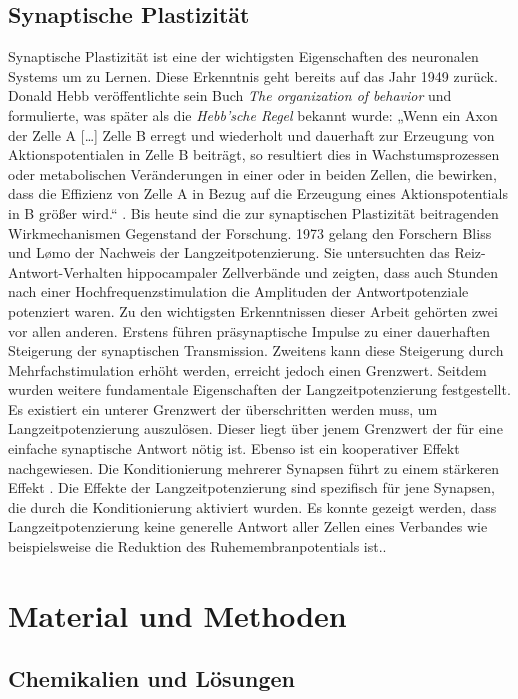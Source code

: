 \documentclass[a4paper,11pt]{report}
\begin{document}
{\section{Synaptische Plastizität}
Synaptische Plastizität ist eine der wichtigsten Eigenschaften des neuronalen Systems um zu Lernen. Diese Erkenntnis geht bereits auf das Jahr 1949 zurück. Donald Hebb veröffentlichte sein Buch \textit{The organization of behavior} und formulierte, was später als die \textit{Hebb'sche Regel} bekannt wurde: „Wenn ein Axon der Zelle A […] Zelle B erregt und wiederholt und dauerhaft zur Erzeugung von Aktionspotentialen in Zelle B beiträgt, so resultiert dies in Wachstumsprozessen oder metabolischen Veränderungen in einer oder in beiden Zellen, die bewirken, dass die Effizienz von Zelle A in Bezug auf die Erzeugung eines Aktionspotentials in B größer wird.“ \cite{Hebb.1949}. Bis heute sind die zur synaptischen Plastizität beitragenden Wirkmechanismen Gegenstand der Forschung. 1973 gelang den Forschern Bliss und Lømo der Nachweis der Langzeitpotenzierung. Sie untersuchten das Reiz-Antwort-Verhalten hippocampaler Zellverbände und zeigten, dass auch Stunden nach einer Hochfrequenzstimulation die Amplituden der Antwortpotenziale potenziert waren. Zu den wichtigsten Erkenntnissen dieser Arbeit gehörten zwei vor allen anderen. Erstens führen präsynaptische Impulse zu einer dauerhaften Steigerung der synaptischen Transmission. Zweitens kann diese Steigerung durch Mehrfachstimulation erhöht werden, erreicht jedoch einen Grenzwert.\cite{Bliss.1973} Seitdem wurden weitere fundamentale Eigenschaften der Langzeitpotenzierung festgestellt. Es existiert ein unterer Grenzwert der überschritten werden muss, um Langzeitpotenzierung auszulösen. Dieser liegt über jenem Grenzwert der für eine einfache synaptische Antwort nötig ist. Ebenso ist ein kooperativer Effekt nachgewiesen. Die Konditionierung mehrerer Synapsen führt zu einem stärkeren Effekt \cite{McNaughton.1978}. Die Effekte der Langzeitpotenzierung sind spezifisch für jene Synapsen, die durch die Konditionierung aktiviert wurden. Es konnte gezeigt werden, dass Langzeitpotenzierung keine generelle Antwort aller Zellen eines Verbandes wie beispielsweise die Reduktion des Ruhemembranpotentials ist.\cite{Levy.1979}.


\chapter{Material und Methoden}

\section{Chemikalien und Lösungen}

}
\end{document}
